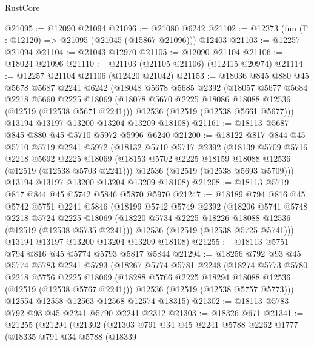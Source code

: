 \begin{lexlean}{RustCore}
\begin{coremodule}
@21095 := @12090 @21094
@21096 := @21080 @6242
@21102 := @12373 (fun (Γ : @12120) => @21095 (@21045 (@15867 @21096))) @12403
@21103 := @12257 @21094
@21104 := @21043 @12970
@21105 := @12090 @21104
@21106 := @18024 @21096
@21110 := @21103 (@21105 @21106) (@12415 @20974)
@21114 := @12257 @21104 @21106 (@12420 @21042)
@21153 := @18036
    @845
    @880
    @45
    @5678
    @5687
    @2241
    @6242
    (@18048
      @5678
      @5685
      @2392
      (@18057
        @5677
        @5684
        @2218
        @5660
        @2225
        @18069
        (@18078 @5670 @2225 @18086 @18088 @12536 (@12519 (@12538 @5671 @2241)))
        @12536
        (@12519 (@12538 @5661 @5677)))
      @13194
      @13197
      @13200
      @13204
      @13209
      @18108)
@21161 := @18113 @5687 @845 @880 @45 @5710 @5972 @5996 @6240
@21200 := @18122
    @817
    @844
    @45
    @5710
    @5719
    @2241
    @5972
    (@18132
      @5710
      @5717
      @2392
      (@18139
        @5709
        @5716
        @2218
        @5692
        @2225
        @18069
        (@18153 @5702 @2225 @18159 @18088 @12536 (@12519 (@12538 @5703 @2241)))
        @12536
        (@12519 (@12538 @5693 @5709)))
      @13194
      @13197
      @13200
      @13204
      @13209
      @18108)
@21208 := @18113 @5719 @817 @844 @45 @5742 @5846 @5870 @5970
@21247 := @18189
    @794
    @816
    @45
    @5742
    @5751
    @2241
    @5846
    (@18199
      @5742
      @5749
      @2392
      (@18206
        @5741
        @5748
        @2218
        @5724
        @2225
        @18069
        (@18220 @5734 @2225 @18226 @18088 @12536 (@12519 (@12538 @5735 @2241)))
        @12536
        (@12519 (@12538 @5725 @5741)))
      @13194
      @13197
      @13200
      @13204
      @13209
      @18108)
@21255 := @18113 @5751 @794 @816 @45 @5774 @5793 @5817 @5844
@21294 := @18256
    @792
    @93
    @45
    @5774
    @5783
    @2241
    @5793
    (@18267
      @5774
      @5781
      @2248
      (@18274
        @5773
        @5780
        @2218
        @5756
        @2225
        @18069
        (@18288 @5766 @2225 @18294 @18088 @12536 (@12519 (@12538 @5767 @2241)))
        @12536
        (@12519 (@12538 @5757 @5773)))
      @12554
      @12558
      @12563
      @12568
      @12574
      @18315)
@21302 := @18113 @5783 @792 @93 @45 @2241 @5790 @2241 @2312
@21303 := @18326 @671
@21341 := @21255
    (@21294
      (@21302
        (@21303
          @791
          @34
          @45
          @2241
          @5788
          @2262
          @1777
          (@18335
            @791
            @34
            @5788
            (@18339

\end{coremodule}
\end{lexlean}
